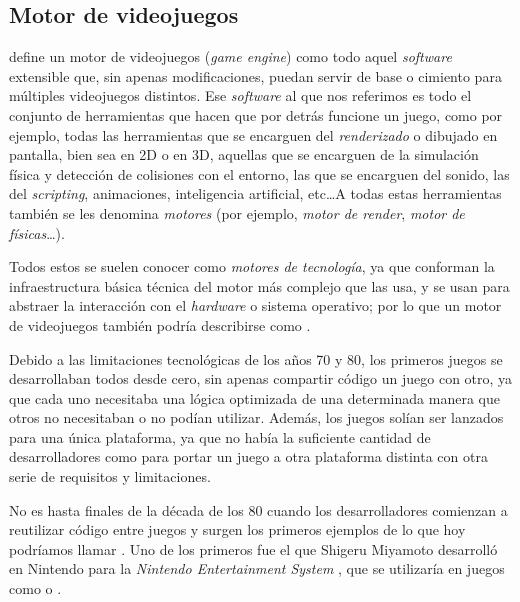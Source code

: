 \subsection{Motor de videojuegos}
\cite{gregory2018game} define un motor de videojuegos (\textit{game engine}) como todo aquel \textit{software} extensible que, sin apenas modificaciones, puedan servir de base o cimiento para múltiples videojuegos distintos. Ese \textit{software} al que nos referimos es todo el conjunto de herramientas que hacen que por detrás funcione un juego, como por ejemplo, todas las herramientas que se encarguen del \textit{renderizado} o dibujado en pantalla, bien sea en 2D o en 3D, aquellas que se encarguen de la simulación física y detección de colisiones con el entorno, las que se encarguen del sonido, las del \textit{scripting}, animaciones, inteligencia artificial, etc\ldots A todas estas herramientas también se les denomina \textit{motores} (por ejemplo, \textit{motor de render}, \textit{motor de físicas}\ldots).

\smallskip

Todos estos  se suelen conocer como \textit{motores de tecnología}, ya que conforman la infraestructura básica técnica del motor más complejo que las usa, y se usan para abstraer la interacción con el \textit{hardware} o sistema operativo; por lo que un motor de videojuegos también podría describirse como .

\medskip

Debido a las limitaciones tecnológicas de los años 70 y 80, los primeros juegos se desarrollaban todos desde cero, sin apenas compartir código un juego con otro, ya que cada uno necesitaba una lógica optimizada de una determinada manera que otros no necesitaban o no podían utilizar. Además, los juegos solían ser lanzados para una única plataforma, ya que no había la suficiente cantidad de desarrolladores como para portar un juego a otra plataforma distinta con otra serie de requisitos y limitaciones.

\smallskip

No es hasta finales de la década de los 80 cuando los desarrolladores comienzan a reutilizar código entre juegos y surgen los primeros ejemplos de lo que hoy podríamos llamar . Uno de los primeros fue el que Shigeru Miyamoto desarrolló en Nintendo para la \textit{Nintendo Entertainment System} \citep{williams2017history}, que se utilizaría en juegos como  o .

